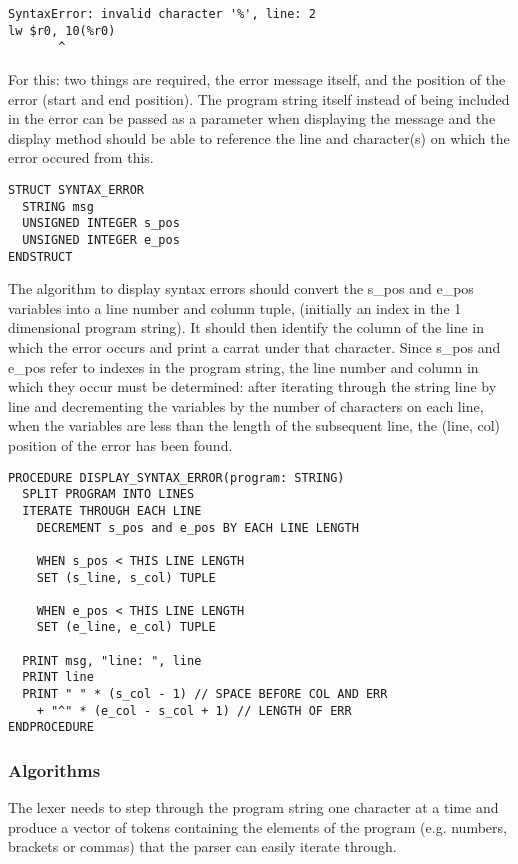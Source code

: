 \begin{lstlisting}
SyntaxError: invalid character '%', line: 2
lw $r0, 10(%r0)
       ^
\end{lstlisting}

For this: two things are required, the error message itself, and the position of the error (start and end position). The program string itself instead of being included in the error can be passed as a parameter when displaying the message and the display method should be able to reference the line and character(s) on which the error occured from this.

\begin{lstlisting}
STRUCT SYNTAX_ERROR
  STRING msg
  UNSIGNED INTEGER s_pos 
  UNSIGNED INTEGER e_pos
ENDSTRUCT
\end{lstlisting}

The algorithm to display syntax errors should convert the s\_pos and e\_pos variables into a line number and column tuple, (initially an index in the 1 dimensional program string). It should then identify the column of the line in which the error occurs and print a carrat under that character. Since s\_pos and e\_pos refer to indexes in the program string, the line number and column in which they occur must be determined: after iterating through the string line by line and decrementing the variables by the number of characters on each line, when the variables are less than the length of the subsequent line, the (line, col) position of the error has been found.

\begin{lstlisting}
PROCEDURE DISPLAY_SYNTAX_ERROR(program: STRING)
  SPLIT PROGRAM INTO LINES
  ITERATE THROUGH EACH LINE 
    DECREMENT s_pos and e_pos BY EACH LINE LENGTH 

    WHEN s_pos < THIS LINE LENGTH 
    SET (s_line, s_col) TUPLE

    WHEN e_pos < THIS LINE LENGTH
    SET (e_line, e_col) TUPLE

  PRINT msg, "line: ", line
  PRINT line 
  PRINT " " * (s_col - 1) // SPACE BEFORE COL AND ERR
    + "^" * (e_col - s_col + 1) // LENGTH OF ERR
ENDPROCEDURE
\end{lstlisting}

\subsubsection{Algorithms}
The lexer needs to step through the program string one character at a time and produce a vector of tokens containing the elements of the program (e.g. numbers, brackets or commas) that the parser can easily iterate through. 

